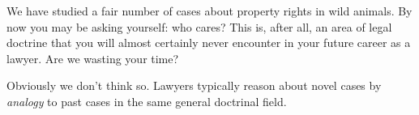 We have studied a fair number of cases about property rights in wild animals. By
now you may be asking yourself: who cares? This is, after all, an area of legal
doctrine that you will almost certainly never encounter in your future career as
a lawyer. Are we wasting your time?

Obviously we don't think so.
%
%
%
Lawyers typically reason about novel cases by
\textit{analogy} to past cases in the same general doctrinal field.
